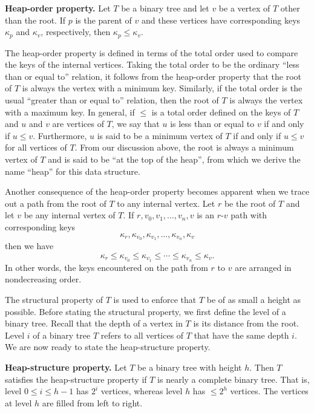 \begin{definition}
\textbf{Heap-order property.}
Let $T$ be a binary tree and let $v$ be a vertex of $T$ other than the
root. If $p$ is the parent of $v$ and these vertices have corresponding
keys $\kappa_p$ and $\kappa_v$, respectively, then
$\kappa_p \leq \kappa_v$.
\end{definition}

The heap-order property is defined in terms
of the total order used to compare the keys of the internal
vertices. Taking the total order to be the ordinary
``less than or equal to'' relation, it follows from the heap-order
property that the root of $T$ is always the vertex with a minimum
key. Similarly, if the total order is the usual
``greater than or equal to'' relation, then the root of $T$ is always
the vertex with a maximum key. In general, if $\leq$ is a total order
defined on the keys of $T$ and $u$ and $v$ are vertices of $T$, we say
that $u$ is less than or equal to $v$ if and only if $u \leq v$.
Furthermore, $u$ is said to be a minimum vertex of $T$ if and only if
$u \leq v$ for all vertices of $T$. From our discussion above, the
root is always a minimum vertex of $T$ and is said to be ``at the top
of the heap'', from which we derive the name ``heap'' for this data
structure.

Another consequence of the heap-order
property becomes apparent when we trace out a path from the root of
$T$ to any internal vertex. Let $r$ be the root of $T$ and let $v$ be
any internal vertex of $T$. If $r, v_0, v_1, \dots, v_n, v$ is an
$r$-$v$ path with corresponding keys
\[
\kappa_r, \kappa_{v_0}, \kappa_{v_1}, \dots, \kappa_{v_n}, \kappa_v
\]
then we have
\[
\kappa_r \leq \kappa_{v_0} \leq \kappa_{v_1} \leq \cdots \leq
\kappa_{v_n} \leq \kappa_v.
\]
In other words, the keys encountered on the path from $r$ to $v$ are
arranged in nondecreasing order.

The structural property of $T$ is used to enforce that $T$ be of as
small a height as possible. Before stating the structural property, we
first define the level of a binary
tree. Recall that the depth of a vertex in $T$ is its distance from
the root. Level $i$ of a binary tree $T$
refers to all vertices of $T$ that have the same depth $i$. We are now
ready to state the heap-structure property.

\begin{definition}
\textbf{Heap-structure property.}
Let $T$ be a binary tree with height $h$. Then $T$ satisfies the
heap-structure property if $T$ is nearly a
complete binary tree. That is, level
$0 \leq i \leq h - 1$ has $2^i$ vertices, whereas level $h$ has
$\leq 2^h$ vertices. The vertices at level $h$ are filled from left to
right.
\end{definition}

